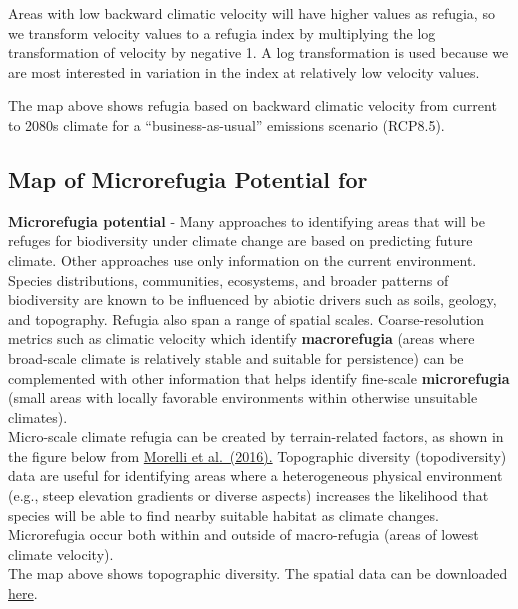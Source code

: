 \documentclass[
]{article}
\begin{document}
Areas with low backward climatic velocity will have higher values as
refugia, so we transform velocity values to a refugia index by
multiplying the log transformation of velocity by negative 1. A log
transformation is used because we are most interested in variation in
the index at relatively low velocity values.

The map above shows refugia based on backward climatic velocity from
current to 2080s climate for a ``business-as-usual'' emissions scenario
(RCP8.5).

\pagebreak

\hypertarget{map-of-microrefugia-potential-for}{%
\subsection{Map of Microrefugia Potential
for}\label{map-of-microrefugia-potential-for}}

\textbf{Microrefugia potential} - Many approaches to identifying areas
that will be refuges for biodiversity under climate change are based on
predicting future climate. Other approaches use only information on the
current environment. Species distributions, communities, ecosystems, and
broader patterns of biodiversity are known to be influenced by abiotic
drivers such as soils, geology, and topography. Refugia also span a
range of spatial scales. Coarse-resolution metrics such as climatic
velocity which identify \textbf{macrorefugia} (areas where broad-scale
climate is relatively stable and suitable for persistence) can be
complemented with other information that helps identify fine-scale
\textbf{microrefugia} (small areas with locally favorable environments
within otherwise unsuitable climates).\\
Micro-scale climate refugia can be created by terrain-related factors,
as shown in the figure below from
\href{https://journals.plos.org/plosone/article?id=10.1371/journal.pone.0159909}{Morelli
et al.~(2016).} Topographic diversity (topodiversity) data are useful
for identifying areas where a heterogeneous physical environment (e.g.,
steep elevation gradients or diverse aspects) increases the likelihood
that species will be able to find nearby suitable habitat as climate
changes.\\
Microrefugia occur both within and outside of macro-refugia (areas of
lowest climate velocity).\\
The map above shows topographic diversity. The spatial data can be
downloaded
\href{https://adaptwest.databasin.org/pages/environmental-diversity-north-america}{here}.
\end{document}
